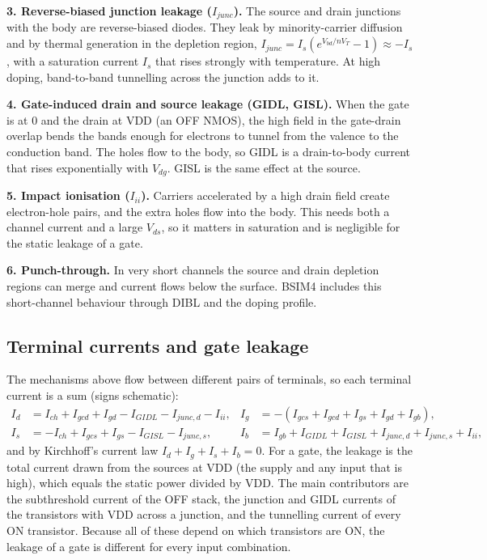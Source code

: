 \documentclass[10pt]{article}
\begin{document}
\textbf{3. Reverse-biased junction leakage ($I_{junc}$).} The source and drain junctions with the
body are reverse-biased diodes. They leak by minority-carrier diffusion and by thermal generation
in the depletion region, $I_{junc} = I_s\left(e^{V_{bd}/nV_T} - 1\right) \approx -I_s$, with a
saturation current $I_s$ that rises strongly with temperature. At high doping, band-to-band
tunnelling across the junction adds to it.

\textbf{4. Gate-induced drain and source leakage (GIDL, GISL).} When the gate is at 0 and the drain
at VDD (an OFF NMOS), the high field in the gate-drain overlap bends the bands enough for electrons
to tunnel from the valence to the conduction band. The holes flow to the body, so GIDL is a
drain-to-body current that rises exponentially with $V_{dg}$. GISL is the same effect at the
source.

\textbf{5. Impact ionisation ($I_{ii}$).} Carriers accelerated by a high drain field create
electron-hole pairs, and the extra holes flow into the body. This needs both a channel current and
a large $V_{ds}$, so it matters in saturation and is negligible for the static leakage of a gate.

\textbf{6. Punch-through.} In very short channels the source and drain depletion regions can merge
and current flows below the surface. BSIM4 includes this short-channel behaviour through DIBL and
the doping profile.

\subsection*{Terminal currents and gate leakage}

The mechanisms above flow between different pairs of terminals, so each terminal current is a sum
(signs schematic):
\begin{align*}
I_d &= I_{ch} + I_{gcd} + I_{gd} - I_{GIDL} - I_{junc,d} - I_{ii}, &
I_g &= -(I_{gcs} + I_{gcd} + I_{gs} + I_{gd} + I_{gb}),\\
I_s &= -I_{ch} + I_{gcs} + I_{gs} - I_{GISL} - I_{junc,s}, &
I_b &= I_{gb} + I_{GIDL} + I_{GISL} + I_{junc,d} + I_{junc,s} + I_{ii},
\end{align*}
and by Kirchhoff's current law $I_d + I_g + I_s + I_b = 0$. For a gate, the leakage is the total
current drawn from the sources at VDD (the supply and any input that is high), which equals the
static power divided by VDD. The main contributors are the subthreshold current of the OFF stack,
the junction and GIDL currents of the transistors with VDD across a junction, and the tunnelling
current of every ON transistor. Because all of these depend on which transistors are ON, the
leakage of a gate is different for every input combination.
\end{document}
